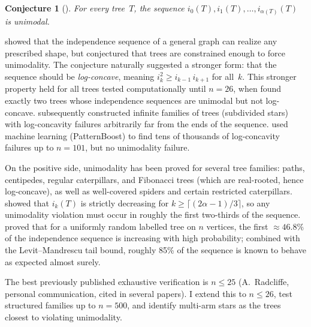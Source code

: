 \documentclass[12pt,oneside]{article}
\newtheorem{conjecture}{Conjecture}
\theoremstyle{remark}
\begin{document}
\begin{conjecture}[\citealp{alavi1987}]\label{conj:main}
  For every tree~$T$, the sequence $i_0(T), i_1(T), \dotsc, i_{\alpha(T)}(T)$ is unimodal.
\end{conjecture}

\citet{alavi1987} showed that the independence sequence of a general graph can realize any prescribed shape, but conjectured that trees are constrained enough to force unimodality.
The conjecture naturally suggested a stronger form: that the sequence should be \emph{log-concave}, meaning $i_k^2 \ge i_{k-1}\, i_{k+1}$ for all~$k$.
This stronger property held for all trees tested computationally until $n = 26$, when \citet{kadrawi2023} found exactly two trees whose independence sequences are unimodal but not log-concave.
\citet{galvin2025} subsequently constructed infinite families of trees (subdivided stars) with log-concavity failures arbitrarily far from the ends of the sequence.
\citet{ramos2025} used machine learning (PatternBoost) to find tens of thousands of log-concavity failures up to $n = 101$, but no unimodality failure.

On the positive side, unimodality has been proved for several tree families: paths, centipedes, regular caterpillars, and Fibonacci trees (which are real-rooted, hence log-concave), as well as well-covered spiders and certain restricted caterpillars.
\citet{levit2006} showed that $i_k(T)$ is strictly decreasing for $k \ge \lceil (2\alpha - 1)/3 \rceil$, so any unimodality violation must occur in roughly the first two-thirds of the sequence.
\citet{heilman2025} proved that for a uniformly random labelled tree on $n$ vertices, the first $\approx 46.8\%$ of the independence sequence is increasing with high probability; combined with the Levit--Mandrescu tail bound, roughly 85\% of the sequence is known to behave as expected almost surely.

The best previously published exhaustive verification is $n \le 25$ (A.~Radcliffe, personal communication, cited in several papers).
I extend this to $n \le 26$, test structured families up to $n = 500$, and identify multi-arm stars as the trees closest to violating unimodality.
\end{document}
